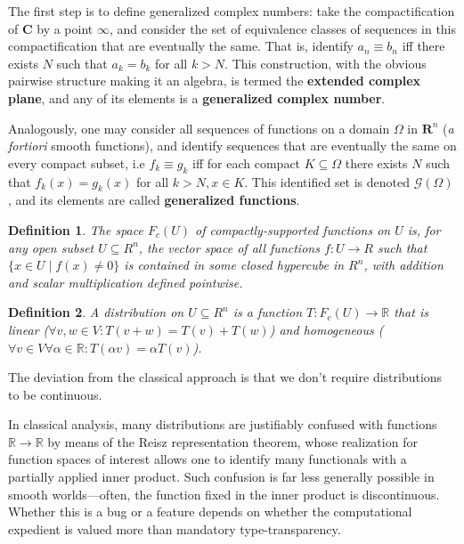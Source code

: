 \documentclass{article}
\newtheorem{definition}{Definition}
\begin{document}
The first step is to define generalized complex numbers: take the compactification of $\mathbf{C}$ by a point $\infty$,
and consider the set of equivalence classes of sequences in this compactification that are eventually the same.
That is, identify $a_{n} \equiv b_{n}$ iff there exists $N$ such that $a_{k} = b_{k}$ for all $k > N$.
This construction, with the obvious pairwise structure making it an algebra, is termed the \textbf{extended complex plane},
and any of its elements is a \textbf{generalized complex number}.

Analogously, one may consider all sequences of functions on a domain $\Omega$ in $\mathbf{R}^{n}$ (\textit{a fortiori} smooth functions),
and identify sequences that are eventually the same on every compact subset,
i.e $f_{k} \equiv g_{k}$ iff for each compact $K \subseteq \Omega$ there exists $N$ such that $f_{k}(x) = g_{k}(x)$ for all $k > N, x \in K$.
This identified set is denoted $\mathcal{G}(\Omega)$, and its elements are called \textbf{generalized functions}.





\begin{definition}
  The space $F_{c}(U)$ of compactly-supported functions on $U$ is, for any open subset $U \subseteq R^{n}$,
  the vector space of all functions $f: U \to R$ such that $\{x \in U \mid f(x) \neq 0\}$ is contained in some closed hypercube in $R^{n}$,
  with addition and scalar multiplication defined pointwise.
\end{definition}

\begin{definition}
  A distribution on $U \subseteq R^{n}$ is a function $T: F_{c}(U) \to \mathbb{R}$
  that is linear ($\forall v, w \in V: T(v + w) = T(v) + T(w)$)
  and homogeneous ($\forall v \in V \forall \alpha \in \mathbb{R}: T(\alpha v) = \alpha T(v)$).
\end{definition}

The deviation from the classical approach is that we don't require distributions to be continuous.

In classical analysis, many distributions are justifiably confused with functions $\mathbb{R} \to \mathbb{R}$
by means of the Reisz representation theorem,
whose realization for function spaces of interest allows one to identify many functionals with a partially applied inner product.
Such confusion is far less generally possible in smooth worlds---often, the function fixed in the inner product is discontinuous.
Whether this is a bug or a feature depends on whether the computational expedient is valued more than mandatory type-transparency.
\end{document}
